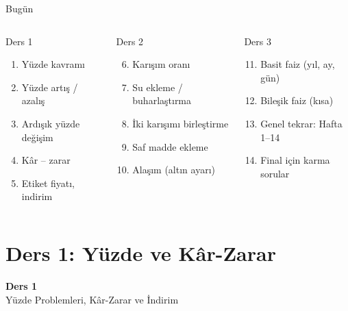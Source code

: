 \documentclass[aspectratio=169,11pt]{beamer}
\begin{document}
\begin{frame}{Bugün}
\begin{columns}[t]
\begin{block}{Ders 1}
\begin{enumerate}
\item Yüzde kavramı
\item Yüzde artış / azalış
\item Ardışık yüzde değişim
\item Kâr -- zarar
\item Etiket fiyatı, indirim
\end{enumerate}
\end{block}
\begin{block}{Ders 2}
\begin{enumerate}\setcounter{enumi}{5}
\item Karışım oranı
\item Su ekleme / buharlaştırma
\item İki karışımı birleştirme
\item Saf madde ekleme
\item Alaşım (altın ayarı)
\end{enumerate}
\end{block}
\begin{block}{Ders 3}
\begin{enumerate}\setcounter{enumi}{10}
\item Basit faiz (yıl, ay, gün)
\item Bileşik faiz (kısa)
\item Genel tekrar: Hafta 1--14
\item Final için karma sorular
\end{enumerate}
\end{block}
\end{columns}
\end{frame}

\section{Ders 1: Yüzde ve Kâr-Zarar}
\begin{frame}
\centering\Large\color{anamavi}\textbf{Ders 1}\\[6pt]\normalsize Yüzde Problemleri, Kâr-Zarar ve İndirim
\end{frame}
\end{document}

